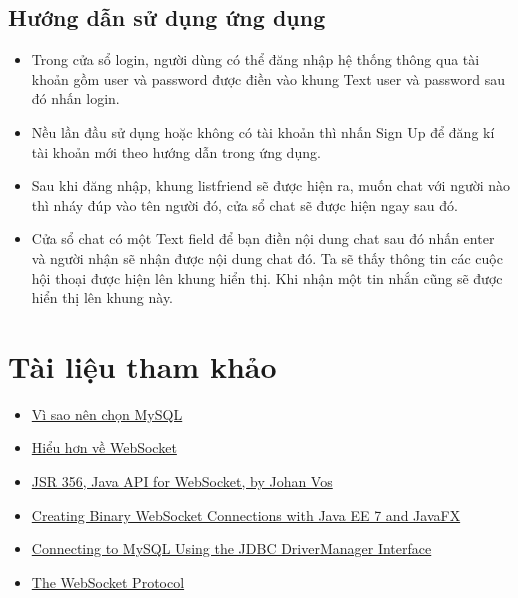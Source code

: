 \documentclass[10pt]{article}
\begin{document}
		\subsection{Hướng dẫn sử dụng ứng dụng}
		\begin{itemize}
				\item Trong cửa sổ login, người dùng có thể đăng nhập hệ thống thông qua tài khoản gồm user và password được điền vào khung Text user và password sau đó nhấn login.
				\item Nều lần đầu sử dụng hoặc không có tài khoản thì nhấn Sign Up để đăng kí tài khoản mới theo hướng dẫn trong ứng dụng.
				\item Sau khi đăng nhập, khung listfriend sẽ được hiện ra, muốn chat với người nào thì nháy đúp vào tên người đó, cửa sổ chat sẽ được hiện ngay sau đó.
				\item Cửa sổ chat có một Text field để bạn điền nội dung chat sau đó nhấn enter và người nhận sẽ nhận được nội dung chat đó. Ta sẽ thấy thông tin các cuộc hội thoại được hiện lên khung hiển thị. Khi nhận một tin nhắn cũng sẽ được hiển thị lên khung này.
			\end{itemize}
	\section{Tài liệu tham khảo}
		\begin{itemize}
			\item \href{http://t3h.vn/lap-trinh-va-csdl/tin-tuc/Kien-Thuc-Lap-Trinh/Vi-sao-nen-chon-MySQL-5-487}{Vì sao nên chọn MySQL}
			\item \href{https://viblo.asia/phamkykhoi/posts/znVGL2r0RZOe}{Hiểu hơn về WebSocket}	
			\item \href{http://www.oracle.com/technetwork/articles/java/jsr356-1937161.html}{JSR 356, Java API for WebSocket, by Johan Vos}			
			\item \href{http://www.oracle.com/webfolder/technetwork/tutorials/obe/java/BinaryWebSocket/binaryWebSocket.html#}{Creating Binary WebSocket Connections with Java EE 7 and JavaFX}
			\item \href{https://dev.mysql.com/doc/connector-j/5.1/en/connector-j-usagenotes-connect-drivermanager.html}{Connecting to MySQL Using the JDBC DriverManager Interface}
			\item \href{https://tools.ietf.org/html/rfc6455}{The WebSocket Protocol}
		\end{itemize}
\end{document}

